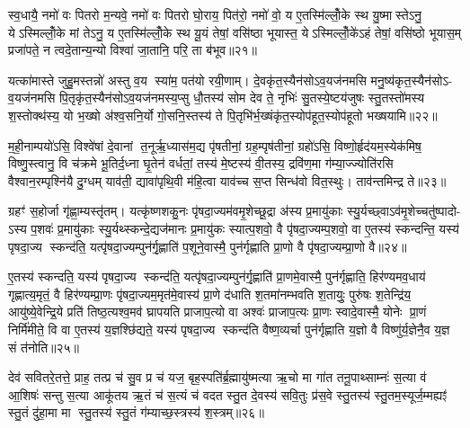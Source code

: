 स्व॒धायै॒ नमो॑ वः पितरो म॒न्यवे॒ नमो॑ वः पितरो घो॒राय॒ पित॑रो॒ नमो॑ वो॒ य ए॒तस्मि॑ल्लोँ॒के स्थ यु॒ष्मास्तेऽनु॒ येऽस्मिल्लोँ॒के मां तेऽनु॒ य ए॒तस्मि॑ल्लोँ॒के स्थ यू॒यं तेषां॒ वसि॑ष्ठा भूयास्त॒ येऽस्मिल्लोँ॒के॑ऽहं तेषां॒ वसि॑ष्ठो भूयास॒म् प्रजा॑पते॒ न त्वदे॒तान्य॒न्यो विश्वा॑ जा॒तानि॒ परि॒ ता ब॑भूव॥२१॥

यत्का॑मास्ते जुहु॒मस्तन्नो॑ अस्तु व॒य स्या॑म॒ पत॑यो रयी॒णाम्। दे॒वकृ॑त॒स्यैन॑सोऽव॒यज॑नमसि मनु॒ष्य॑कृत॒स्यैन॑सोऽ- व॒यज॑नमसि पि॒तृकृ॑त॒स्यैन॑सोऽव॒यज॑नमस्य॒प्सु धौ॒तस्य॑ सोम देव ते॒ नृभिः॑ सु॒तस्ये॒ष्टय॑जुषः स्तु॒तस्तो॑मस्य श॒स्तोक्थ॑स्य॒ यो भ॒ख्षो अ॑श्व॒सनि॒र्यो गो॒सनि॒स्तस्य॑ ते पि॒तृभि॑र्भ॒ख्षंकृ॑त॒स्योप॑हूत॒स्योप॑हूतो भख्षयामि॥२२॥

{\anuvakamend[{वि॒श्व॒च॒र्\mbox{}ष॒णे॒ त्रि॒ष्टुफ्छ॑न्दस॒ इन्द्र॑पीतस्य॒ नरा॒शस॑पीत॒स्याति॑ स्तु॒तस्तो॑मस्य जी॒वाय॒ नमो॑ वः पितरो बभूव॒ चतु॑श्चत्वारिशच्च॥५॥}]}

म॒ही॒नाम्पयो॑ऽसि॒ विश्वे॑षां दे॒वानां त॒नूर्\mbox{}ऋ॒ध्यास॑म॒द्य पृ॑षतीनां॒ ग्रह॒म्पृष॑तीनां॒ ग्रहो॑ऽसि॒ विष्णो॒र्\mbox{}हृद॑यम॒स्येक॑मिष॒ विष्णु॒स्त्वानु॒ वि च॑क्रमे भू॒तिर्द॒ध्ना घृ॒तेन॑ वर्धतां॒ तस्य॑ मे॒ष्टस्य॑ वी॒तस्य॒ द्रवि॑ण॒मा ग॑म्या॒ज्ज्योति॑रसि वैश्वान॒रम्पृश्नि॑यै दु॒ग्धम् याव॑ती॒ द्यावा॑पृथि॒वी म॑हि॒त्वा याव॑च्च स॒प्त सिन्ध॑वो वित॒स्थुः। ताव॑न्तमिन्द्र ते॥२३॥

ग्रहꣳ॑ स॒होर्जा गृ॑ह्णा॒म्यस्तृ॑तम्। यत्कृ॑ष्णशकु॒नः पृ॑षदा॒ज्यम॑वमृ॒शेच्छू॒द्रा अ॑स्य प्र॒मायु॑काः स्यु॒र्यच्छ्वाऽव॑मृ॒शेच्चतु॑ष्पादो- ऽस्य प॒शवः॑ प्र॒मायु॑काः स्यु॒र्यथ्स्कन्दे॒द्यज॑मानः प्र॒मायु॑कः स्यात्प॒शवो॒ वै पृ॑षदा॒ज्यम्प॒शवो॒ वा ए॒तस्य॑ स्कन्दन्ति॒ यस्य॑ पृषदा॒ज्य स्कन्द॑ति॒ यत्पृ॑षदा॒ज्यम्पुन॑र्गृ॒ह्णाति॑ प॒शूने॒वास्मै॒ पुन॑र्गृह्णाति प्रा॒णो वै पृ॑षदा॒ज्यम्प्रा॒णो वै॥२४॥

ए॒तस्य॑ स्कन्दति॒ यस्य॑ पृषदा॒ज्य स्कन्द॑ति॒ यत्पृ॑षदा॒ज्यम्पुन॑र्गृ॒ह्णाति॑ प्रा॒णमे॒वास्मै॒ पुन॑र्गृह्णाति॒ हिर॑ण्यमव॒धाय॑ गृह्णात्य॒मृतं॒ वै हिर॑ण्यम्प्रा॒णः पृ॑षदा॒ज्यम॒मृत॑मे॒वास्य॑ प्रा॒णे द॑धाति श॒तमा॑नम्भवति श॒तायुः॒ पुरु॑षः श॒तेन्द्रि॑य॒ आयु॑ष्ये॒वेन्द्रि॒ये प्रति॑ तिष्ठ॒त्यश्व॒मव॑ घ्रापयति प्राजाप॒त्यो वा अश्वः॑ प्राजाप॒त्यः प्रा॒णः स्वादे॒वास्मै॒ योनेः प्रा॒णं निर्मि॑मीते॒ वि वा ए॒तस्य॑ य॒ज्ञश्छि॑द्यते॒ यस्य॑ पृषदा॒ज्य स्कन्द॑ति वैष्ण॒व्यर्चा पुन॑र्गृह्णाति य॒ज्ञो वै विष्णु॑र्य॒ज्ञेनै॒व य॒ज्ञ सं त॑नोति॥२५॥

{\anuvakamend[{ते॒ पृ॒ष॒दा॒ज्यम्प्रा॒णो वै योनेः प्रा॒णन्द्वाविꣳ॑शतिश्च॥६॥}]}

देव॑ सवितरे॒तत्ते॒ प्राह॒ तत्प्र च॑ सु॒व प्र च॑ यज॒ बृह॒स्पति॑र्ब्र॒ह्मायु॑ष्मत्या ऋ॒चो मा गा॑त तनू॒पाथ्साम्नः॑ स॒त्या व॑ आ॒शिषः॑ सन्तु स॒त्या आकू॑तय ऋ॒तं च॑ स॒त्यं च॑ वदत स्तु॒त दे॒वस्य॑ सवि॒तुः प्र॑स॒वे स्तु॒तस्य॑ स्तु॒तम॒स्यूर्ज॒म्मह्यꣵ॑ स्तु॒तं दु॑हा॒मा मा स्तु॒तस्य॑ स्तु॒तं ग॑म्याच्छ॒स्त्रस्य॑ श॒स्त्रम्॥२६॥

